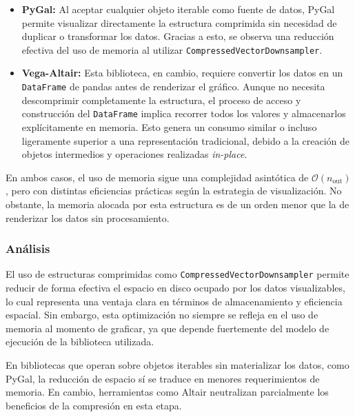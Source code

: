 \begin{itemize}
    \item \textbf{PyGal:} Al aceptar cualquier objeto iterable como fuente de datos, PyGal permite visualizar directamente la estructura comprimida sin necesidad de duplicar o transformar los datos. Gracias a esto, se observa una reducción efectiva del uso de memoria al utilizar \texttt{CompressedVectorDownsampler}.

    \item \textbf{Vega-Altair:} Esta biblioteca, en cambio, requiere convertir los datos en un \texttt{DataFrame} de pandas antes de renderizar el gráfico. Aunque no necesita descomprimir completamente la estructura, el proceso de acceso y construcción del \texttt{DataFrame} implica recorrer todos los valores y almacenarlos explícitamente en memoria. Esto genera un consumo similar o incluso ligeramente superior a una representación tradicional, debido a la creación de objetos intermedios y operaciones realizadas \textit{in-place}.
\end{itemize}

En ambos casos, el uso de memoria sigue una complejidad asintótica de \(\mathcal{O}(n_{\text{out}})\), pero con distintas eficiencias prácticas según la estrategia de visualización. No obstante, la memoria alocada por esta estructura es de un orden menor que la de renderizar los datos sin procesamiento.

\subsubsection{Análisis}

El uso de estructuras comprimidas como \texttt{CompressedVectorDownsampler} permite reducir de forma efectiva el espacio en disco ocupado por los datos visualizables, lo cual representa una ventaja clara en términos de almacenamiento y eficiencia espacial. Sin embargo, esta optimización no siempre se refleja en el uso de memoria al momento de graficar, ya que depende fuertemente del modelo de ejecución de la biblioteca utilizada.

En bibliotecas que operan sobre objetos iterables sin materializar los datos, como PyGal, la reducción de espacio sí se traduce en menores requerimientos de memoria. En cambio, herramientas como Altair neutralizan parcialmente los beneficios de la compresión en esta etapa.

